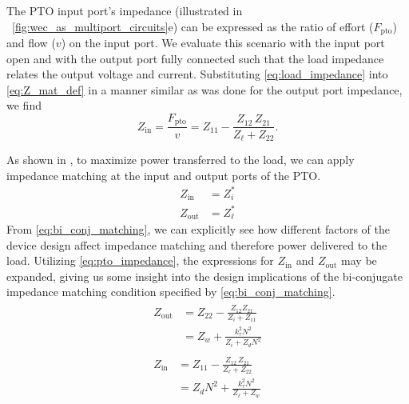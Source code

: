 \documentclass[lettersize,journal]{IEEEtran}
\begin{document}
The PTO input port's impedance (illustrated in \figurename~\ref{fig:wec_as_multiport_circuits}e) can be expressed as the ratio of effort ($F_{\textrm{pto}}$) and flow ($v$) on the input port.
We evaluate this scenario with the input port open and with the output port fully connected such that the load impedance relates the output voltage and current.
Substituting \eqref{eq:load_impedance} into \eqref{eq:Z_mat_def} in a manner similar as was done for the output port impedance, we find
%
\begin{equation}
        Z_{\textrm{in}} = \frac{F_{\textrm{pto}}}{v}=  Z_{11} - \frac{Z_{12} \, Z_{21}}{Z_\ell + Z_{22}} .
        \label{eq:pto_input_port_impedance}
\end{equation}

As shown in  \cite{Bacelli:2021aa}, to maximize power transferred to the load, we can apply impedance matching at the input and output ports of the PTO.
%
\begin{subequations}
    \begin{align}
        Z_{\textrm{in}} &= Z_i^*  \label{eq:bi_conj_matching_in} \\ 
        Z_{\textrm{out}} &= Z_\ell^* \label{eq:bi_conj_matching_out}
    \end{align}
\label{eq:bi_conj_matching}%
\end{subequations}
%
From \eqref{eq:bi_conj_matching}, we can explicitly see how different factors of the device design affect impedance matching and therefore power delivered to the load.
Utilizing \eqref{eq:pto_impedance}, the expressions for $Z_{\textrm{in}}$ and $Z_{\textrm{out}}$ may be expanded, giving us some insight into the design implications of the bi-conjugate impedance matching condition specified by \eqref{eq:bi_conj_matching}.
%
\begin{subequations}
\begin{align}
        \begin{split}
                Z_{\textrm{out}} &=  Z_{22} - \frac{Z_{12} Z_{21}}{Z_{i} + Z_{11}} \\[0.5em]
                &=  Z_w + \frac{k_\tau^2 N^2}{Z_i + Z_d N^2}
        \end{split}\label{eq:expanded_zin} \\[1em]
        \begin{split}
                Z_{\textrm{in}} &= Z_{11} - \frac{Z_{12} \, Z_{21}}{Z_\ell + Z_{22}} \\[0.5em]
                &= Z_d N^2 + \frac{k_\tau^2 N^2}{Z_\ell + Z_w}
        \end{split}\label{eq:expanded_zout}
\end{align}\label{eq:expanded_z}%
\end{subequations}
\end{document}
